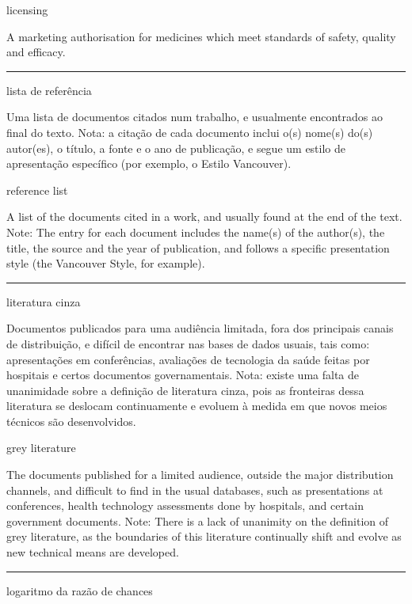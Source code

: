 \documentclass[
]{book}
\begin{document}
licensing

A marketing authorisation for medicines which meet standards of safety, quality and efficacy.

\begin{center}\rule{0.5\linewidth}{0.5pt}\end{center}

lista de referência

Uma lista de documentos citados num trabalho, e usualmente encontrados ao final do texto. Nota: a citação de cada documento inclui o(s) nome(s) do(s) autor(es), o título, a fonte e o ano de publicação, e segue um estilo de apresentação específico (por exemplo, o Estilo Vancouver).

reference list

A list of the documents cited in a work, and usually found at the end of the text. Note: The entry for each document includes the name(s) of the author(s), the title, the source and the year of publication, and follows a specific presentation style (the Vancouver Style, for example).

\begin{center}\rule{0.5\linewidth}{0.5pt}\end{center}

literatura cinza

Documentos publicados para uma audiência limitada, fora dos principais canais de distribuição, e difícil de encontrar nas bases de dados usuais, tais como: apresentações em conferências, avaliações de tecnologia da saúde feitas por hospitais e certos documentos governamentais. Nota: existe uma falta de unanimidade sobre a definição de literatura cinza, pois as fronteiras dessa literatura se deslocam continuamente e evoluem à medida em que novos meios técnicos são desenvolvidos.

grey literature

The documents published for a limited audience, outside the major distribution channels, and difficult to find in the usual databases, such as presentations at conferences, health technology assessments done by hospitals, and certain government documents. Note: There is a lack of unanimity on the definition of grey literature, as the boundaries of this literature continually shift and evolve as new technical means are developed.

\begin{center}\rule{0.5\linewidth}{0.5pt}\end{center}

logaritmo da razão de chances
\end{document}
